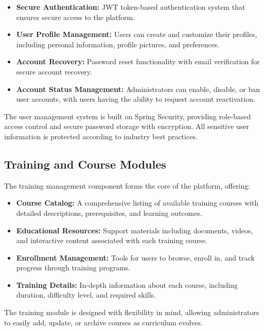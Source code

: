 \documentclass[12pt,a4paper]{report}
\begin{document}
\begin{itemize}
    \item \textbf{Secure Authentication:} JWT token-based authentication system that ensures secure access to the platform.

    \item \textbf{User Profile Management:} Users can create and customize their profiles, including personal information, profile pictures, and preferences.

    \item \textbf{Account Recovery:} Password reset functionality with email verification for secure account recovery.

    \item \textbf{Account Status Management:} Administrators can enable, disable, or ban user accounts, with users having the ability to request account reactivation.
\end{itemize}

The user management system is built on Spring Security, providing role-based access control and secure password storage with encryption. All sensitive user information is protected according to industry best practices.

\subsection{Training and Course Modules}
The training management component forms the core of the platform, offering:

\begin{itemize}
    \item \textbf{Course Catalog:} A comprehensive listing of available training courses with detailed descriptions, prerequisites, and learning outcomes.

    \item \textbf{Educational Resources:} Support materials including documents, videos, and interactive content associated with each training course.

    \item \textbf{Enrollment Management:} Tools for users to browse, enroll in, and track progress through training programs.

    \item \textbf{Training Details:} In-depth information about each course, including duration, difficulty level, and required skills.
\end{itemize}

The training module is designed with flexibility in mind, allowing administrators to easily add, update, or archive courses as curriculum evolves.
\end{document}
